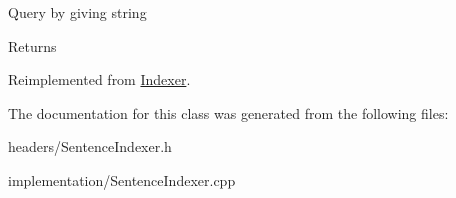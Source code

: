 Query by giving string \begin{DoxyReturn}{Returns}

\end{DoxyReturn}


Reimplemented from \hyperlink{classIndexer_abd1dd6a6da0c9e43efaa99866c538e6c}{Indexer}.



The documentation for this class was generated from the following files\+:\begin{DoxyCompactItemize}
\item 
headers/Sentence\+Indexer.\+h\item 
implementation/Sentence\+Indexer.\+cpp\end{DoxyCompactItemize}
